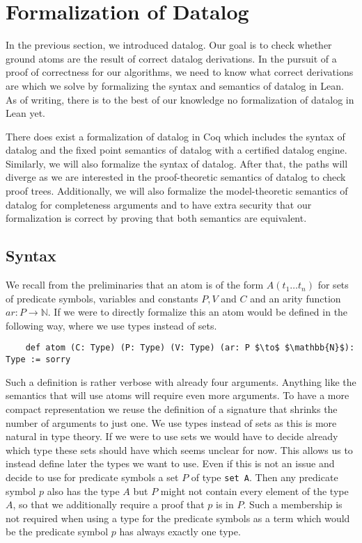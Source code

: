 \section{Formalization of Datalog}\label{sec:formDatalog}
In the previous section, we introduced datalog. Our goal is to check whether ground atoms are the result of correct datalog derivations. In the pursuit of a proof of correctness for our algorithms, we need to know what correct derivations are which we solve by formalizing the syntax and semantics of datalog in Lean. As of writing, there is to the best of our knowledge no formalization of datalog in Lean yet. 

There does exist a formalization of datalog in Coq\cite{datalogCoq} which includes the syntax of datalog and the fixed point semantics of datalog with a certified datalog engine. Similarly, we will also formalize the syntax of datalog. After that, the paths will diverge as we are interested in the proof-theoretic semantics of datalog to check proof trees. Additionally, we will also formalize the model-theoretic semantics of datalog for completeness arguments and to have extra security that our formalization is correct by proving that both semantics are equivalent.

\subsection{Syntax}

We recall from the preliminaries that an atom is of the form $A(t_1 \dots t_n)$ for sets of predicate symbols, variables and constants $P, V$ and $C$ and an arity function $ar: P \to \mathbb{N}$. If we were to directly formalize this an atom would be defined in the following way, where we use types instead of sets.

\begin{lstlisting}
    def atom (C: Type) (P: Type) (V: Type) (ar: P $\to$ $\mathbb{N}$): Type := sorry
\end{lstlisting}

Such a definition is rather verbose with already four arguments. Anything like the semantics that will use atoms will require even more arguments. To have a more compact representation we reuse the definition of a signature that shrinks the number of arguments to just one.  We use types instead of sets as this is more natural in type theory. If we were to use sets we would have to decide already which type these sets should have which seems unclear for now. This allows us to instead define later the types we want to use. Even if this is not an issue and decide to use for predicate symbols a set $P$ of type \lstinline|set A|. Then any predicate symbol $p$ also has the type $A$ but $P$ might not contain every element of the type $A$, so that we additionally require a proof that $p$ is in $P$. Such a membership is not required when using a type for the predicate symbols as a term which would be the predicate symbol $p$ has always exactly one type. 

